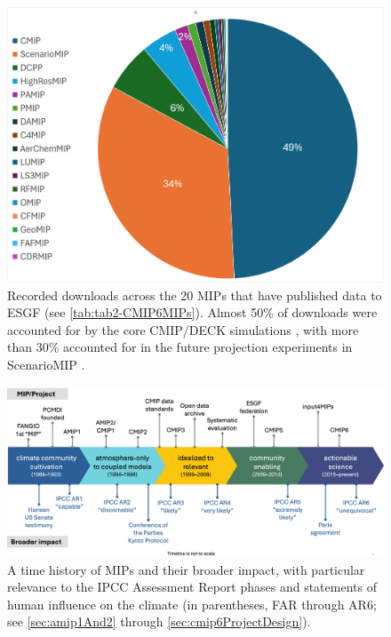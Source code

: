 \documentclass[gmd, preprint]{copernicus}
\begin{document}
\begin{figure}
    \centering
    \includegraphics[width=1\linewidth]{240918_durack1-cmip6-experiments_240903.png}
    \caption{Recorded downloads across the 20 MIPs that have published data to ESGF (see \autoref{tab:tab2-CMIP6MIPs}). Almost 50\% of downloads were accounted for by the core CMIP/DECK simulations \citep{eyring_overview_2016}, with more than 30\% accounted for in the future projection experiments in ScenarioMIP \citep{oneill_scenario_2016}.}
    \label{fig:fig5-MIPDownloads}
\end{figure}

\begin{figure}
    \centering
    \includegraphics[width=\textwidth]{241019_durack1-AMIP-CMIP-IPCC-Impact-trim.png}
    \caption{A time history of MIPs and their broader impact, with particular relevance to the IPCC Assessment Report phases and statements of human influence on the climate (in parentheses, FAR through AR6; see \autoref{sec:amip1And2} through \autoref{sec:cmip6ProjectDesign}).}
    \label{fig:fig6-MIPImpact}
\end{figure}
\end{document}
